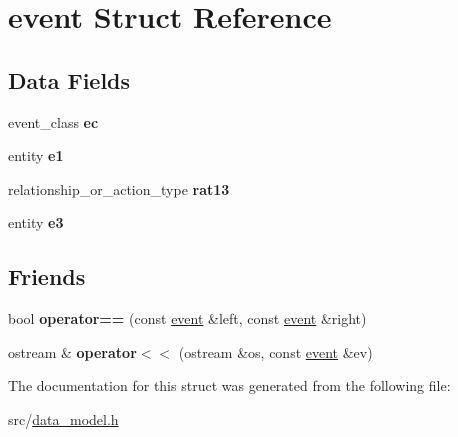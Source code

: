\hypertarget{structevent}{}\section{event Struct Reference}
\label{structevent}
\subsection*{Data Fields}
\begin{DoxyCompactItemize}
\item 
event\+\_\+class {\bfseries ec}\hypertarget{structevent_ac32b92ff80a203fd7c27e7313e4429d2}{}\label{structevent_ac32b92ff80a203fd7c27e7313e4429d2}

\item 
entity {\bfseries e1}\hypertarget{structevent_a829a8f5791c5189324ffa115608f20ee}{}\label{structevent_a829a8f5791c5189324ffa115608f20ee}

\item 
relationship\+\_\+or\+\_\+action\+\_\+type {\bfseries rat13}\hypertarget{structevent_a4bf1c0667655028954126c33657330c9}{}\label{structevent_a4bf1c0667655028954126c33657330c9}

\item 
entity {\bfseries e3}\hypertarget{structevent_ac7c3b30ab1c81bece0be283c615a7015}{}\label{structevent_ac7c3b30ab1c81bece0be283c615a7015}

\end{DoxyCompactItemize}
\subsection*{Friends}
\begin{DoxyCompactItemize}
\item 
bool {\bfseries operator==} (const \hyperlink{structevent}{event} \&left, const \hyperlink{structevent}{event} \&right)\hypertarget{structevent_a3dd0c9c41d63a2d2171cffc7dfa14d6c}{}\label{structevent_a3dd0c9c41d63a2d2171cffc7dfa14d6c}

\item 
ostream \& {\bfseries operator$<$$<$} (ostream \&os, const \hyperlink{structevent}{event} \&ev)\hypertarget{structevent_a4d697ad127dbb87399c435f1e216ec8a}{}\label{structevent_a4d697ad127dbb87399c435f1e216ec8a}

\end{DoxyCompactItemize}


The documentation for this struct was generated from the following file\+:\begin{DoxyCompactItemize}
\item 
src/\hyperlink{data__model_8h}{data\+\_\+model.\+h}\end{DoxyCompactItemize}

